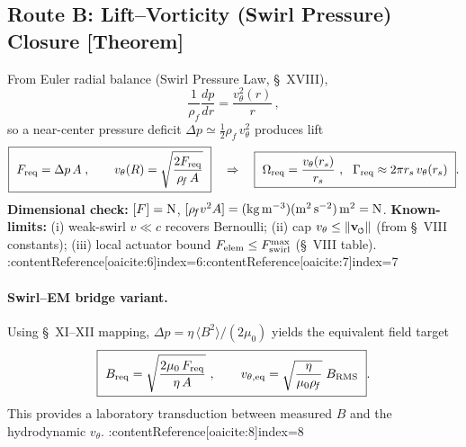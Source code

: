 \documentclass[10pt,reprint,aps,onecolumn,nofootinbib]{revtex4-2}
\newcommand{\vnorm}{\lVert \mathbf{v}_{\mkern-2mu\scriptscriptstyle\boldsymbol{\circlearrowleft}} \rVert}               %
\newcommand{\rhoF}{\rho_{\!f}}     %
\begin{document}
    \subsection{Route B: Lift--Vorticity (Swirl Pressure) Closure [Theorem]}
        \label{subsec:LiftRoute}
        From Euler radial balance (Swirl Pressure Law, \S~XVIII),
        \[
            \frac{1}{\rhoF}\frac{d p}{dr}=\frac{v_\theta^2(r)}{r}\,,
        \]
        so a near-center pressure deficit $\Delta p \simeq \tfrac{1}{2}\rhoF\,v_\theta^2$ produces lift
        \begin{equation}
        \boxed{\ F_{\rm req}=\Delta p\,A\;,\qquad v_\theta(R)=\sqrt{\frac{2F_{\rm req}}{\rhoF\,A}}\ }\quad\Rightarrow\quad
        \boxed{\ \Omega_{\rm req}=\frac{v_\theta(r_s)}{r_s}\ ,\ \ \Gamma_{\rm req}\approx 2\pi r_s\,v_\theta(r_s)\ }.
        \end{equation}
        \textbf{Dimensional check:} $[F]=\rm N$, $[\rhoF v^2 A]=\rm (kg\,m^{-3})(m^2\,s^{-2})\,m^2=N$.
        \textbf{Known-limits:} (i) weak-swirl $v\!\ll\!c$ recovers Bernoulli; (ii) cap $v_\theta\le \vnorm$ (from \S~VIII constants); (iii) local actuator bound $F_{\rm elem}\le F_{\text{swirl}}^{\max}$ (\S~VIII table). :contentReference[oaicite:6]{index=6}:contentReference[oaicite:7]{index=7}

        \paragraph{Swirl--EM bridge variant.}
            Using \S~XI--XII mapping, $\Delta p=\eta\,\langle B^2\rangle/(2\mu_0)$ yields the equivalent field target
            \begin{equation}
            \boxed{\ B_{\rm req}=\sqrt{\frac{2\mu_0\,F_{\rm req}}{\eta\,A}}\ ,\qquad
            v_{\theta,{\rm eq}}=\sqrt{\frac{\eta}{\mu_0\rhoF}}\;B_{\rm RMS}\ }.
            \end{equation}
            This provides a laboratory transduction between measured $B$ and the hydrodynamic $v_\theta$. :contentReference[oaicite:8]{index=8}
\end{document}
